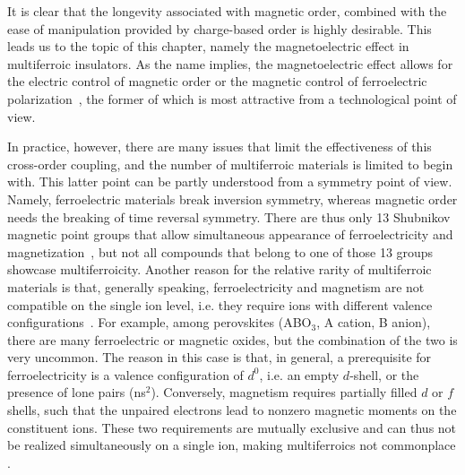 It is clear that the longevity associated with magnetic order, combined with the ease of manipulation provided by charge-based order is highly desirable.
This leads us to the topic of this chapter, namely the magnetoelectric effect in multiferroic insulators.
As the name implies, the magnetoelectric effect allows for the electric control of magnetic order or the magnetic control of ferroelectric polarization~\cite{Spaldin2019,Khomskii2009,Fiebig2005,Fiebig2016,Cheong2007}, the former of which is most attractive from a technological point of view.

In practice, however, there are many issues that limit the effectiveness of this cross-order coupling, and the number of multiferroic materials is limited to begin with.
This latter point can be partly understood from a symmetry point of view.
Namely, ferroelectric materials break inversion symmetry, whereas magnetic order needs the breaking of time reversal symmetry.
There are thus only 13 Shubnikov magnetic point groups that allow simultaneous appearance of ferroelectricity and magnetization~\cite{Wang2009}, but not all compounds that belong to one of those 13 groups showcase multiferroicity.
Another reason for the relative rarity of multiferroic materials is that, generally speaking, ferroelectricity and magnetism are not compatible on the single ion level, i.e. they require ions with different valence configurations~\cite{Spaldin2019}.
For example, among perovskites (ABO$_3$, A cation, B anion), there are many ferroelectric or magnetic oxides, but the combination of the two is very uncommon.
The reason in this case is that, in general, a prerequisite for ferroelectricity is a valence configuration of $d^0$, i.e. an empty $d$-shell, or the presence of lone pairs (ns$^2$).
Conversely, magnetism requires partially filled $d$ or $f$ shells, such that the unpaired electrons lead to nonzero magnetic moments on the constituent ions.
These two requirements are mutually exclusive and can thus not be realized simultaneously on a single ion, making multiferroics not commonplace .

